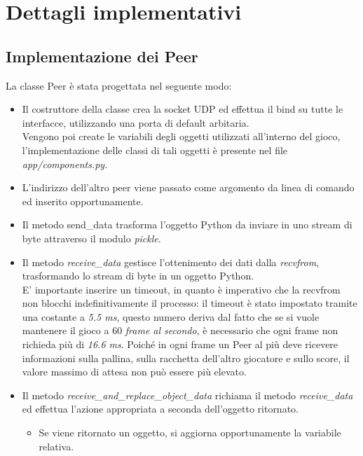
\thispagestyle{headings}
\newpage
\section{Dettagli implementativi}\label{sec:implementazione}

\subsection{Implementazione dei Peer}\label{subsec:implementazione-dei-peer}

La classe Peer è stata progettata nel seguente modo:
\begin{itemize}
    \item Il costruttore della classe crea la socket UDP ed effettua il bind su tutte le interfacce, utilizzando
    una porta di default arbitaria. \\
    Vengono poi create le variabili degli oggetti utilizzati all'interno del gioco, l'implementazione
    delle classi di tali oggetti è presente nel file
    \textit{app/components.py}.
    \item L'indirizzo dell'altro peer viene passato come argomento da linea di comando ed inserito opportunamente.
    \item Il metodo send\_data trasforma l'oggetto Python da inviare in uno stream di byte attraverso il modulo
    \textit{pickle}.
    \item Il metodo \textit{receive\_data} gestisce l'ottenimento dei dati dalla \textit{recvfrom}, trasformando lo
    stream di byte in un oggetto Python. \\
    E' importante inserire un timeout, in quanto è imperativo che la recvfrom non blocchi indefinitivamente il processo:
    il timeout è stato impostato tramite una costante a \textit{5.5 ms}, questo numero deriva dal fatto che se si vuole
    mantenere il gioco a 60 \textit{frame al secondo}, è necessario che ogni frame non richieda più di \textit{16.6 ms}.
    Poiché in ogni frame un Peer al più deve ricevere informazioni sulla pallina, sulla racchetta dell'altro giocatore
    e sullo score, il valore massimo di attesa non può essere più elevato.
    \item Il metodo \textit{receive\_and\_replace\_object\_data} richiama il metodo \textit{receive\_data} ed effettua
    l'azione appropriata a seconda dell'oggetto ritornato.
        \begin{itemize}
            \item Se viene ritornato un oggetto, si aggiorna opportunamente la variabile relativa.

\end{itemize}
\end{itemize}
